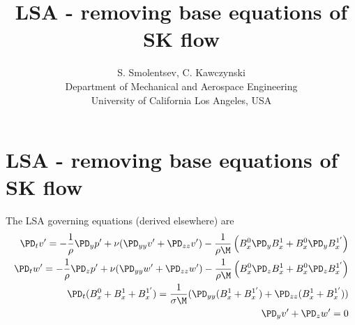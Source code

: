 \documentclass[11pt]{article}
\begin{document}
\doublespacing
\title{LSA - removing base equations of SK flow}
\author{S. Smolentsev, C. Kawczynski \\
Department of Mechanical and Aerospace Engineering \\
University of California Los Angeles, USA\\
}
\maketitle

\section{LSA - removing base equations of SK flow}

The LSA governing equations (derived elsewhere) are
\begin{equation}\begin{aligned}
\PD_t v' = -\frac{1}{\rho}\PD_y p' + \nu (\PD_{yy} v'+\PD_{zz} v') - \frac{1}{\rho \M} \left( B_x^0 \PD_y B_x^1 + B_x^0 \PD_y B_x^{1'} \right) \\
\PD_t w' = -\frac{1}{\rho}\PD_z p' + \nu (\PD_{yy} w'+\PD_{zz} w') - \frac{1}{\rho \M} \left( B_x^0 \PD_z B_x^1 + B_x^0 \PD_z B_x^{1'} \right) \\
\PD_t (B_x^{0}+B_x^{1}+B_x^{1'}) = \frac{1}{\sigma \M} (\PD_{yy} (B_x^{1}+B_x^{1'})+\PD_{zz} (B_x^{1}+B_x^{1'})) \\
\PD_y v' + \PD_z w' = 0  \\
\end{aligned} \end{equation}
\end{document}
